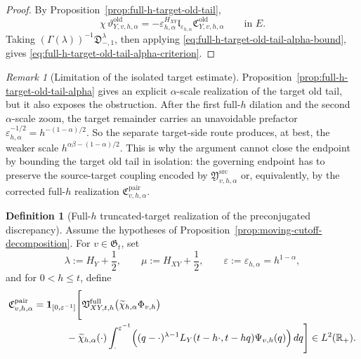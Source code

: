 \documentclass[11pt,a4paper]{amsart}
\theoremstyle{plain}
\theoremstyle{definition}
\newtheorem{definition}[theorem]{Definition}
\theoremstyle{remark}
\newtheorem{remark}[theorem]{Remark}
\newcommand{\R}{\mathbb{R}}
\newcommand{\one}{\mathbf 1}
\begin{document}
\begin{proof}
By Proposition~\ref{prop:full-h-target-old-tail},
\[
\chi\,\vartheta_{Y,v,h,\alpha}^{\mathrm{old}}
=
-\varepsilon_{h,\alpha}^{H_{XY}}
\mathfrak l_{\varepsilon_{h,\alpha}}
\mathfrak C_{Y,v,h,\alpha}^{\mathrm{old}}
\qquad\text{in }E.
\]
Taking \((\Gamma(\lambda))^{-1}\mathfrak D_{-,1}^{\lambda}\), then applying
\eqref{eq:full-h-target-old-tail-alpha-bound}, gives
\eqref{eq:full-h-target-old-tail-alpha-criterion}.
\end{proof}

\begin{remark}[Limitation of the isolated target estimate]
\label{rem:full-h-target-old-tail-alpha}
Proposition~\ref{prop:full-h-target-old-tail-alpha} gives an explicit \(\alpha\)-scale realization
of the target old tail, but it also exposes the obstruction. After the first
full-\(h\) dilation and the second \(\alpha\)-scale zoom, the target remainder carries an unavoidable
prefactor \(\varepsilon_{h,\alpha}^{-1/2}=h^{-(1-\alpha)/2}\). So the separate target-side route
produces, at best, the weaker scale \(h^{\alpha\beta-(1-\alpha)/2}\). This is why the argument
cannot close the endpoint by bounding the target old tail in isolation: the governing
endpoint has to preserve the source-target coupling encoded by
\(\mathfrak Y_{v,h,\alpha}^{\mathrm{src}}\) or, equivalently, by the corrected full-\(h\)
realization \(\mathfrak C_{v,h,\alpha}^{\mathrm{pair}}\).
\end{remark}

\begin{definition}[Full-\(h\) truncated-target realization of the preconjugated discrepancy]
\label{def:full-h-coupled-commutator}
Assume the hypotheses of Proposition~\ref{prop:moving-cutoff-decomposition}. For \(v\in\mathfrak G_t\),
set
\[
\lambda:=H_Y+\frac12,
\qquad
\mu:=H_{XY}+\frac12,
\qquad
\varepsilon:=\varepsilon_{h,\alpha}=h^{1-\alpha},
\]
and for \(0<h\le t\), define
\begin{equation}\label{eq:full-h-coupled-commutator}
\begin{aligned}
\mathfrak C_{v,h,\alpha}^{\mathrm{pair}}
={}&
\one_{[0,\varepsilon^{-1}]}
\Biggl[
\mathfrak V_{XY,t,h}^{\mathrm{full}}
\bigl(
\widetilde\chi_{h,\alpha}\Phi_{v,h}
\bigr)
\\
&\qquad
-
\widetilde\chi_{h,\alpha}(\cdot)
\int_{\cdot}^{\varepsilon^{-1}}
\Bigl(
(q-\cdot)^{\lambda-1}
L_Y(t-h\cdot,t-hq)\Psi_{v,h}(q)
\Bigr)\,dq
\Biggr]
\in L^2(\R_+).
\end{aligned}
\end{equation}
\end{definition}
\end{document}
